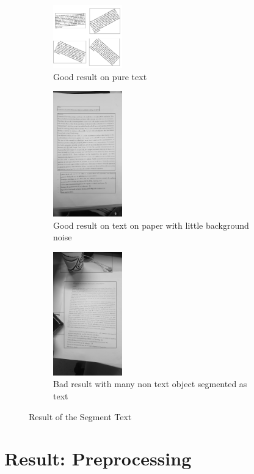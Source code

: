 \documentclass[Report.tex]{subfiles}
\begin{document}
\begin{figure}[ht]
  \centering
  \begin{subfigure}[t]{4cm}
    \includegraphics[width=3cm]{res/segment_text1.png}
    \caption{Good result on pure text}
  \end{subfigure}
  \hspace{5mm}%
  \begin{subfigure}[t]{4cm}
    \includegraphics[width=3cm]{res/segment_text2.png}
    \caption{Good result on text on paper with little background noise}
  \end{subfigure}
  \hspace{5mm}%
  \begin{subfigure}[t]{4cm}
    \includegraphics[width=3cm]{res/segment_text3.png}
    \caption{Bad result with many non text object segmented as text}
  \end{subfigure}
  \caption{Result of the Segment Text}
  \label{fig:Text_detection_result}
\end{figure}

\section{Result: Preprocessing}
\end{document}
